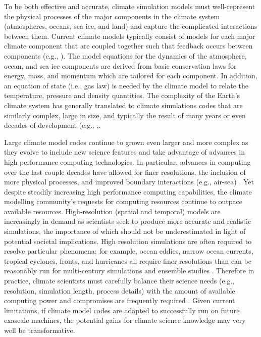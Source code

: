 To be both effective and accurate, climate simulation models must well-represent the physical processes of the major components in the climate system (atmospheres, oceans, sea ice, and land) and capture the complicated interactions between them.  Current climate models typically consist of models for each major climate component that are coupled together such that feedback occurs between components (e.g., \cite{washington2005}).  The model equations for the dynamics of the atmosphere, ocean, and sea ice components are derived from basic conservation laws for energy, mass, and momentum which are tailored for each component.  In addition, an equation of state (i.e., gas law) is needed by the climate model to relate the temperature, pressure and density quantities. 
The complexity of the Earth's climate system has generally translated to climate simulations codes that are similarly complex, large in size, and typically the result of many years or even decades of development (e.g., \cite{easterbrook2011},\cite{pipitone2012}. 

Large climate model codes continue to grown even larger and more complex as they evolve to include new science features and take advantage of advances in high performance computing technologies.
In particular, advances in computing over the last couple decades have allowed for finer resolutions, the inclusion of more physical processes, and improved boundary interactions (e.g., air-sea) \cite{washington2009}. Yet despite steadily increasing high performance computing capabilities, the climate modelling community's requests for computing resources continue to outpace available resources. High-resolution (spatial and temporal) models are increasingly in demand as scientists seek to produce more accurate and realistic simulations, the importance of which should not be underestimated in light of potential societal implications.  High resolution simulations are often required to resolve particular phenomena; for example, ocean eddies, narrow ocean currents, tropical cyclones, fronts, and hurricanes all require finer resolutions than can be reasonably run for multi-century simulations and ensemble studies \cite{washington2009, small2014}.  Therefore in practice, climate scientists must carefully balance their science needs (e.g., resolution, simulation length, process details) with the amount of available computing power and compromises are frequently required \cite{washington2009}.  Given current limitations, if climate model codes are adapted to successfully run on future exascale machines, the potential gains for climate science knowledge may very well be transformative.

